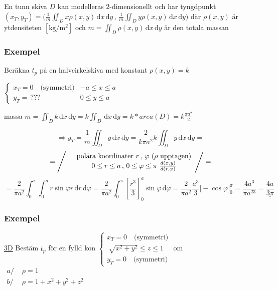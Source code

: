 \documentclass[a4paper]{article}
\newcommand{\svar}[1]{\underline{\underline{#1}}}
\let\oldsqrt\sqrt
\renewcommand*{\sqrt}[2][\ ]{\oldsqrt[#1]{#2} }
\begin{document}
En tunn skiva $D$ kan modelleras $2$-dimensionellt och har tyngdpunkt $(x_T,y_T) = \Big(\frac{1}{m}\iint_Dx\rho(x,y)\,\mathrm{d}x\,\mathrm{d}y \,,\, \frac{1}{m}\iint_Dy\rho(x,y)\,\mathrm{d}x\,\mathrm{d}y\Big)$
där $\rho(x,y)$ är ytdensiteten $\left[\si{\kilogram\per\metre^2}\right]$ och $m = \iint_D\rho(x,y) \,\mathrm{d}x\,\mathrm{d}y$ är den totala massan

\subsubsection{Exempel}
Beräkna $t_p$ på en halvcirkelskiva med konstant $\rho(x,y) = k$

$
\begin{cases}
	x_T = 0 \quad \text{(symmetri)}  & -a \leq x \leq a \\
	y_T = \, ??? & 0 \leq y \leq a
\end{cases}$\newline

massa $m = \iint_D k\,\mathrm{d}x\,\mathrm{d}y =
k \iint_D\,\mathrm{d}x\,\mathrm{d}y =
k * area(D) =
k \frac{\pi a^2}{2}$

$$
	\Rightarrow y_T = \frac{1}{m}\iint_D y\,\mathrm{d}x\,\mathrm{d}y =
	\frac{2}{k\pi a^2} k \iint_D y\,\mathrm{d}x\,\mathrm{d}y =
$$
$$
	= \left/\begin{array}{rcl}
	&\text{polära koordinater $r \,,\, \varphi$ ($\rho$ upptagen)} \\
	&0 \leq r \leq a \,,\, 0 \leq \varphi \leq \pi \,\, \frac{d(x,y)}{d(r,\varphi)}
	\end{array}\right/ =
$$
$$
	= \frac{2}{\pi a^2} \int_0^\pi\int_0^a r\sin{\varphi} r \,\mathrm{d}r\,\mathrm{d}\varphi =
	\frac{2}{\pi a^2} \int_0^\pi \left[ \frac{r^3}{3} \right]_0^a \sin{\varphi} \,\mathrm{d}\varphi =
	\frac{2}{\pi a^2} \frac{a^3}{3} \Big[ -\cos{\varphi} \Big]_0^\pi =
	\frac{4a^3}{\pi a^23} =
	\svar{\frac{4a}{3\pi}}
$$

\newpage
\subsubsection{Exempel}

\underline{3D} Bestäm $t_p$ för en fylld kon \newline
$
\begin{cases}
	x_T = 0 \quad \text{(symmetri)} \\
	\sqrt{x^2+y^2} \leq z \leq 1 \\
	y_T = 0 \quad \text{(symmetri)}
\end{cases}$ om $
\left.\begin{array}{rcl}
	a/ &\,\, \rho = 1 \\
	b/ &\,\, \rho = 1 + x^2 + y^2 + z^2
\end{array}\right.$ \newline
\end{document}
